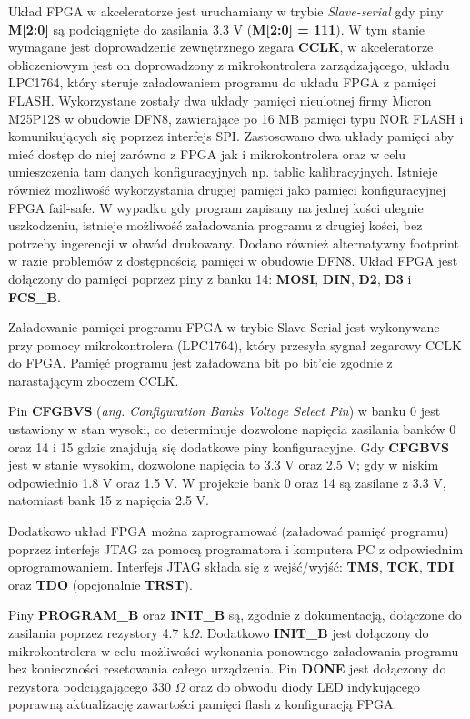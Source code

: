 Układ FPGA w akceleratorze jest uruchamiany w trybie \textit{Slave-serial} gdy piny \textbf{M[2:0]} są podciągnięte do zasilania 3.3 V (\textbf{M[2:0] = 111}). W tym stanie wymagane jest doprowadzenie zewnętrznego zegara \textbf{CCLK}, w akceleratorze obliczeniowym jest on doprowadzony z mikrokontrolera zarządzającego, układu LPC1764, który steruje załadowaniem programu do układu FPGA z pamięci FLASH. Wykorzystane zostały dwa układy pamięci nieulotnej firmy Micron \cite{COMPANY:MICRON} M25P128 \cite{M25P128} w obudowie DFN8, zawierające po 16 MB pamięci typu NOR FLASH i komunikujących się poprzez interfejs SPI. Zastosowano dwa układy pamięci aby mieć dostęp do niej zarówno z FPGA jak i mikrokontrolera oraz w celu umieszczenia tam danych konfiguracyjnych np. tablic kalibracyjnych. Istnieje również możliwość wykorzystania drugiej pamięci jako pamięci konfiguracyjnej FPGA fail-safe. W wypadku gdy program zapisany na jednej kości ulegnie uszkodzeniu, istnieje możliwość załadowania programu z drugiej kości, bez potrzeby ingerencji w obwód drukowany. Dodano również alternatywny footprint w razie problemów z dostępnością pamięci w obudowie DFN8. Układ FPGA jest dołączony do pamięci poprzez piny z banku 14: \textbf{MOSI}, \textbf{DIN}, \textbf{D2}, \textbf{D3} i \textbf{FCS\_B}.


Załadowanie pamięci programu FPGA w trybie Slave-Serial jest wykonywane przy pomocy mikrokontrolera (LPC1764), który przesyła sygnał zegarowy CCLK do FPGA. Pamięć programu jest załadowana bit po bit'cie zgodnie z narastającym zboczem CCLK. 

Pin \textbf{CFGBVS} (\textit{ang. Configuration Banks Voltage Select Pin}) w banku 0 jest ustawiony w stan wysoki, co determinuje dozwolone napięcia zasilania banków 0 oraz 14 i 15 gdzie znajdują się dodatkowe piny konfiguracyjne. Gdy \textbf{CFGBVS} jest w stanie wysokim, dozwolone napięcia to 3.3 V oraz 2.5 V; gdy w niskim odpowiednio 1.8 V oraz 1.5 V. W projekcie bank 0 oraz 14 są zasilane z 3.3 V, natomiast bank 15 z napięcia 2.5 V.

Dodatkowo układ FPGA można zaprogramować (załadować pamięć programu) poprzez interfejs JTAG za pomocą programatora i komputera PC z odpowiednim oprogramowaniem. Interfejs JTAG składa się z wejść/wyjść: \textbf{TMS}, \textbf{TCK}, \textbf{TDI} oraz \textbf{TDO} (opcjonalnie \textbf{TRST}). 

Piny \textbf{PROGRAM\_B} oraz \textbf{INIT\_B} są, zgodnie z dokumentacją, dołączone do zasilania poprzez rezystory 4.7 k$\Omega$. Dodatkowo \textbf{INIT\_B} jest dołączony do mikrokontrolera w celu możliwości wykonania ponownego załadowania programu bez konieczności resetowania całego urządzenia. Pin \textbf{DONE} jest dołączony do rezystora podciągającego 330 $\Omega$ oraz do obwodu diody LED indykującego poprawną aktualizację zawartości pamięci flash z konfiguracją FPGA.

